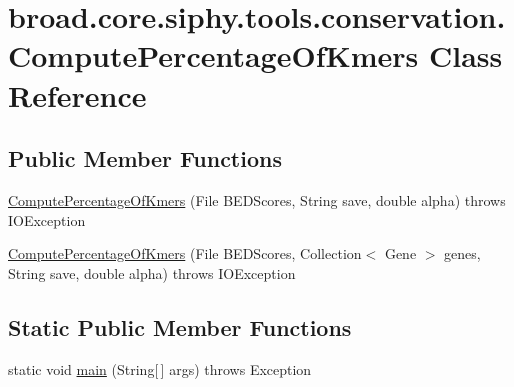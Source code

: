 \hypertarget{classbroad_1_1core_1_1siphy_1_1tools_1_1conservation_1_1_compute_percentage_of_kmers}{\section{broad.\+core.\+siphy.\+tools.\+conservation.\+Compute\+Percentage\+Of\+Kmers Class Reference}
\label{classbroad_1_1core_1_1siphy_1_1tools_1_1conservation_1_1_compute_percentage_of_kmers}
}
\subsection*{Public Member Functions}
\begin{DoxyCompactItemize}
\item 
\hyperlink{classbroad_1_1core_1_1siphy_1_1tools_1_1conservation_1_1_compute_percentage_of_kmers_a9ea8017314f8811b0fff01396a0c90ed}{Compute\+Percentage\+Of\+Kmers} (File B\+E\+D\+Scores, String save, double alpha)  throws I\+O\+Exception
\item 
\hyperlink{classbroad_1_1core_1_1siphy_1_1tools_1_1conservation_1_1_compute_percentage_of_kmers_a71546598e0e805a4e68551e145f32567}{Compute\+Percentage\+Of\+Kmers} (File B\+E\+D\+Scores, Collection$<$ Gene $>$ genes, String save, double alpha)  throws I\+O\+Exception
\end{DoxyCompactItemize}
\subsection*{Static Public Member Functions}
\begin{DoxyCompactItemize}
\item 
static void \hyperlink{classbroad_1_1core_1_1siphy_1_1tools_1_1conservation_1_1_compute_percentage_of_kmers_a00d92409a73035d7ea18563e36763b2a}{main} (String\mbox{[}$\,$\mbox{]} args)  throws Exception
\end{DoxyCompactItemize}


